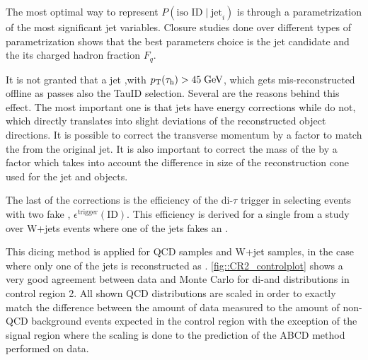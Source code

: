 The most optimal way to represent $P(\text{iso ID}\mid \text{jet}_{i})$ is through a parametrization of the most significant jet variables. Closure studies done over different types of parametrization shows that the best parameters choice is the jet candidate \pt and the its charged hadron fraction $F_{q}$.

It is not granted that a jet ,with $p_{\text{T}}(\tau_{\text{h}})> 45\;\text{Ge}\kern-0.06667em\text{V}$, which gets mis-reconstructed offline as \hadtau passes also the TauID \pt selection. Several are the reasons behind this effect. The most important one is that jets have energy corrections while \hadtaufake do not, which directly translates into slight deviations of the reconstructed object directions. It is possible to correct the \hadtau transverse momentum by a factor to match the \pt from the original jet. It is also important to correct the mass of the \hadtaufake by a factor which takes into account the difference in size of the reconstruction cone used for the jet and \hadtau objects.

The last of the corrections is the efficiency of the di-$\tau$ trigger in selecting events with two fake \hadtau , $\epsilon^{\text{trigger}}(\text{ID})$. This efficiency is derived for a single \hadtaufake from a study over W+jets events where one of the jets fakes an \hadtau.

This dicing method is applied for QCD samples and W+jet samples, in the case where only one of the jets is reconstructed as \hadtaufake. \autoref{fig::CR2_controlplot} shows a very good agreement between data and Monte Carlo for di-\hadtau and \met distributions in control region 2. All shown QCD distributions are scaled in order to exactly match the difference between the amount of data measured to the amount of non-QCD background events expected in the control region with the exception of the signal region where the scaling is done to the prediction of the ABCD method performed on data.


